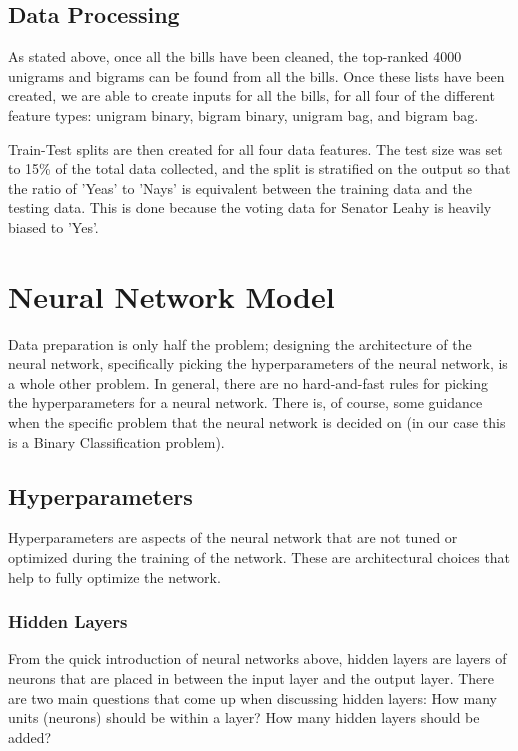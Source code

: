 \documentclass[%
 reprint,
 amsmath,amssymb,
 aps,
]{revtex4-2}
\begin{document}
\subsection{Data Processing}

As stated above, once all the bills have been cleaned, the top-ranked 4000 unigrams and bigrams can be found from all the bills. Once these lists have been created, we are able to create inputs for all the bills, for all four of the different feature types: unigram binary, bigram binary, unigram bag, and bigram bag.

Train-Test splits are then created for all four data features. The test size was set to 15\% of the total data collected, and the split is stratified on the output so that the ratio of 'Yeas' to 'Nays' is equivalent between the training data and the testing data. This is done because the voting data for Senator Leahy is heavily biased to 'Yes'.

\section{Neural Network Model}

Data preparation is only half the problem; designing the architecture of the neural network, specifically picking the hyperparameters of the neural network, is a whole other problem. In general, there are no hard-and-fast rules for picking the hyperparameters for a neural network. There is, of course, some guidance when the specific problem that the neural network is decided on (in our case this is a Binary Classification problem).

\subsection{Hyperparameters}

Hyperparameters are aspects of the neural network that are not tuned or optimized during the training of the network. These are architectural choices that help to fully optimize the network.

\subsubsection{Hidden Layers}

From the quick introduction of neural networks above, hidden layers are layers of neurons that are placed in between the input layer and the output layer. There are two main questions that come up when discussing hidden layers: How many units (neurons) should be within a layer? How many hidden layers should be added?
\end{document}
